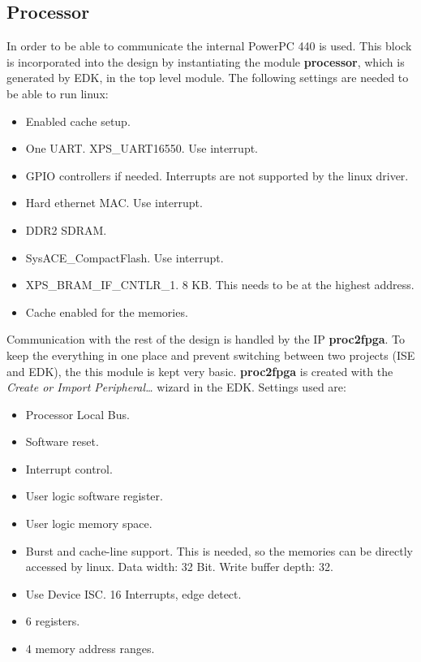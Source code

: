 \documentclass[11pt,technote,a4paper,onecolumn,dvips]{IEEEtran}
\newcommand{\module}[1]{{\ttfamily\bfseries #1}}
\begin{document}
\subsection{Processor}
\label{sec:processor}
In order to be able to communicate the internal PowerPC 440 \cite{ppc} is used.
This block is incorporated into the design by instantiating the module
\module{processor}, which is generated by EDK, in the top level module.
The following settings are needed to be able to run linux:
\begin{itemize}
    \item Enabled cache setup.
    \item One UART. XPS\_UART16550. Use interrupt.
    \item GPIO controllers if needed. Interrupts are not supported by the
        linux driver.
    \item Hard ethernet MAC. Use interrupt.
    \item DDR2 SDRAM.
    \item SysACE\_CompactFlash. Use interrupt.
    \item XPS\_BRAM\_IF\_CNTLR\_1. 8 KB. This needs to be at the highest
        address.
    \item Cache enabled for the memories.
\end{itemize}
Communication with the rest of the design is handled by the IP
\module{proc2fpga}. To
keep the everything in one place and prevent switching between two projects
(ISE and EDK), the this module is kept very basic.
\module{proc2fpga} is created with the \emph{Create or Import Peripheral\ldots}
wizard in the EDK. Settings used are:
\begin{itemize}
    \item Processor Local Bus.
    \item Software reset.
    \item Interrupt control.
    \item User logic software register.
    \item User logic memory space.
    \item Burst and cache-line support. This is needed, so the memories can
        be directly accessed by linux. Data width: 32 Bit. Write buffer depth:
        32.
    \item Use Device ISC. 16 Interrupts, edge detect.
    \item 6 registers.
    \item 4 memory address ranges.
\end{itemize}
\lstset{language=ucf}
\end{document}
